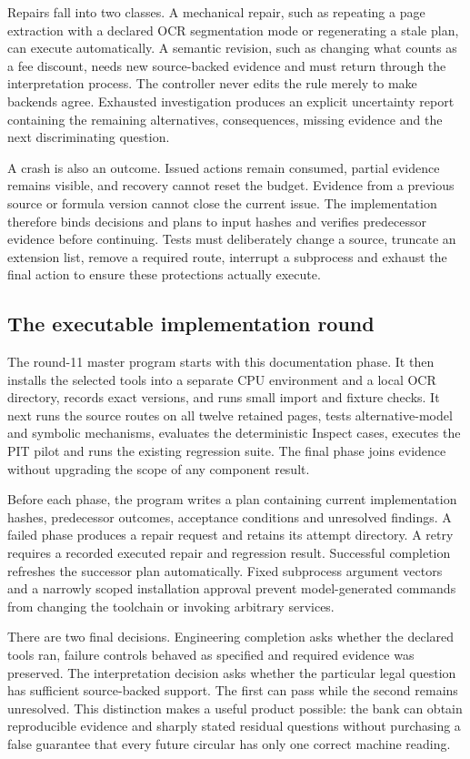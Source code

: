 \documentclass[12pt,a4paper,oneside,openany]{book}
\begin{document}
Repairs fall into two classes. A mechanical repair, such as repeating a page
extraction with a declared OCR segmentation mode or regenerating a stale plan,
can execute automatically. A semantic revision, such as changing what counts as
a fee discount, needs new source-backed evidence and must return through the
interpretation process. The controller never edits the rule merely to make
backends agree. Exhausted investigation produces an explicit uncertainty report
containing the remaining alternatives, consequences, missing evidence and the
next discriminating question.

A crash is also an outcome. Issued actions remain consumed, partial evidence
remains visible, and recovery cannot reset the budget. Evidence from a previous
source or formula version cannot close the current issue. The implementation
therefore binds decisions and plans to input hashes and verifies predecessor
evidence before continuing. Tests must deliberately change a source, truncate
an extension list, remove a required route, interrupt a subprocess and exhaust
the final action to ensure these protections actually execute.

\subsection{The executable implementation round}

The round-11 master program starts with this documentation phase. It then installs
the selected tools into a separate CPU environment and a local OCR directory,
records exact versions, and runs small import and fixture checks. It next runs
the source routes on all twelve retained pages, tests alternative-model and
symbolic mechanisms, evaluates the deterministic Inspect cases, executes the
PIT pilot and runs the existing regression suite. The final phase joins evidence
without upgrading the scope of any component result.

Before each phase, the program writes a plan containing current implementation
hashes, predecessor outcomes, acceptance conditions and unresolved findings. A
failed phase produces a repair request and retains its attempt directory. A
retry requires a recorded executed repair and regression result. Successful
completion refreshes the successor plan automatically. Fixed subprocess argument
vectors and a narrowly scoped installation approval prevent model-generated
commands from changing the toolchain or invoking arbitrary services.

There are two final decisions. Engineering completion asks whether the declared
tools ran, failure controls behaved as specified and required evidence was
preserved. The interpretation decision asks whether the particular legal question
has sufficient source-backed support. The first can pass while the second remains
unresolved. This distinction makes a useful product possible: the bank can obtain
reproducible evidence and sharply stated residual questions without purchasing a
false guarantee that every future circular has only one correct machine reading.
\end{document}
